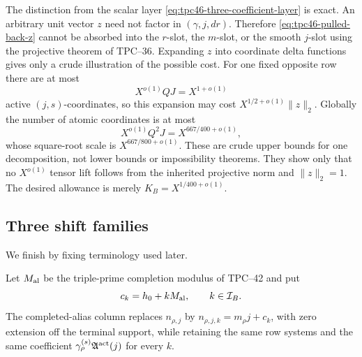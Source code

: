 The distinction from the scalar layer
\eqref{eq:tpc46-three-coefficient-layer} is exact.  An arbitrary unit
vector \(z\) need not factor in \((\gamma,j,dr)\).  Therefore
\eqref{eq:tpc46-pulled-back-z} cannot be absorbed into the \(r\)-slot,
the \(m\)-slot, or the smooth \(j\)-slot using the projective theorem
of TPC--36.  Expanding \(z\) into coordinate delta functions gives only
a crude illustration of the possible cost.  For one fixed opposite row
there are at most
\begin{equation}
 X^{o(1)}QJ=X^{1+o(1)}
 \label{eq:tpc46-fixed-output-active-count}
\end{equation}
active \((j,s)\)-coordinates, so this expansion may cost
\(X^{1/2+o(1)}\|z\|_2\).  Globally the number of atomic coordinates is
at most
\begin{equation}
 X^{o(1)}Q^2J=X^{667/400+o(1)},
 \label{eq:tpc46-global-active-count}
\end{equation}
whose square-root scale is \(X^{667/800+o(1)}\).  These are crude upper
bounds for one decomposition, not lower bounds or impossibility
theorems.  They show only that no \(X^{o(1)}\) tensor lift follows from
the inherited projective norm and \(\|z\|_2=1\).  The desired allowance
is merely \(K_B=X^{1/400+o(1)}\).

\subsection{Three shift families}

We finish by fixing terminology used later.

\begin{definition}
\label{def:tpc46-completed-alias-family}
Let \(M_{\rm al}\) be the triple-prime completion modulus of TPC--42 and put
\begin{equation}
 c_k=h_0+kM_{\rm al},\qquad k\in\mathcal I_B.
 \label{eq:tpc46-completed-intercepts}
\end{equation}
The completed-alias column replaces \(n_{\rho,j}\) by
\(n_{\rho,j,k}=m_\rho j+c_k\), with zero extension off the terminal
support, while retaining the same row systems and the same coefficient
\(\gamma_\rho^{(s)}\mathfrak A^{\rm act}(j)\) for every \(k\).
\end{definition}

